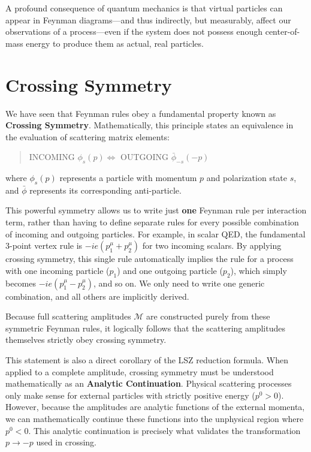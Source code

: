 \begin{remark}
    A profound consequence of quantum mechanics is that virtual particles can appear in Feynman diagrams—and thus indirectly, but measurably, affect our observations of a process—even if the system does not possess enough center-of-mass energy to produce them as actual, real particles.
\end{remark}

\section{Crossing Symmetry}

We have seen that Feynman rules obey a fundamental property known as \textbf{Crossing Symmetry}. Mathematically, this principle states an equivalence in the evaluation of scattering matrix elements:
\begin{quote}
    INCOMING $\phi_s(p) \iff$ OUTGOING $\bar{\phi}_{-s}(-p)$
\end{quote}
where $\phi_s(p)$ represents a particle with momentum $p$ and polarization state $s$, and $\bar{\phi}$ represents its corresponding anti-particle.

This powerful symmetry allows us to write just \textbf{one} Feynman rule per interaction term, rather than having to define separate rules for every possible combination of incoming and outgoing particles. For example, in scalar QED, the fundamental 3-point vertex rule is $-ie(p_1^\mu + p_2^\mu)$ for two incoming scalars.
By applying crossing symmetry, this single rule automatically implies the rule for a process with one incoming particle ($p_1$) and one outgoing particle ($p_2$), which simply becomes $-ie(p_1^\mu - p_2^\mu)$, and so on. We only need to write one generic combination, and all others are implicitly derived.


Because full scattering amplitudes $\mathcal{M}$ are constructed purely from these symmetric Feynman rules, it logically follows that the scattering amplitudes themselves strictly obey crossing symmetry.

\begin{remark}
    This statement is also a direct corollary of the LSZ reduction formula. When applied to a complete amplitude, crossing symmetry must be understood mathematically as an \textbf{Analytic Continuation}. Physical scattering processes only make sense for external particles with strictly positive energy ($p^0 > 0$). However, because the amplitudes are analytic functions of the external momenta, we can mathematically continue these functions into the unphysical region where $p^0 < 0$. This analytic continuation is precisely what validates the transformation $p \to -p$ used in crossing.
\end{remark}

